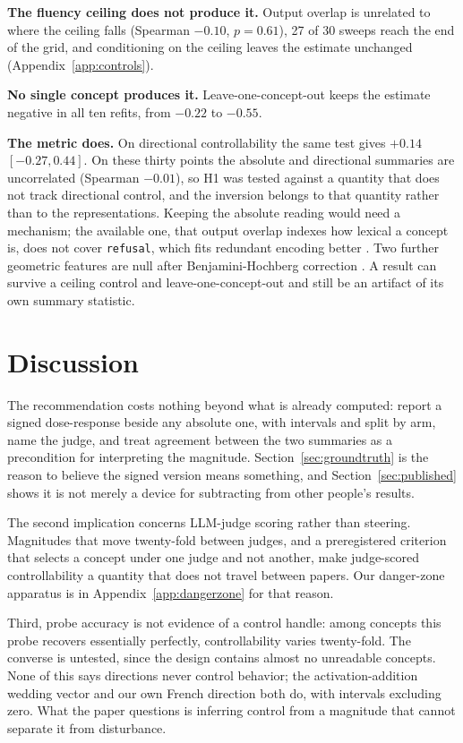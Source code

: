 \documentclass{article}
\begin{document}
\textbf{The fluency ceiling does not produce it.} Output overlap is unrelated to
where the ceiling falls (Spearman $-0.10$, $p=0.61$), 27 of 30 sweeps reach the
end of the grid, and conditioning on the ceiling leaves the estimate unchanged
(Appendix~\ref{app:controls}).

\textbf{No single concept produces it.} Leave-one-concept-out keeps the estimate
negative in all ten refits, from $-0.22$ to $-0.55$.

\textbf{The metric does.} On directional controllability the same test gives
$+0.14$ $[-0.27, 0.44]$. On these thirty points the absolute and directional
summaries are uncorrelated (Spearman $-0.01$), so H1 was tested against a
quantity that does not track directional control, and the inversion belongs to
that quantity rather than to the representations. Keeping the absolute reading
would need a mechanism; the available one, that output overlap indexes how
lexical a concept is, does not cover \texttt{refusal}, which fits redundant
encoding better \citep{joad2026refusal, elhage2022superposition}. Two further
geometric features are null after Benjamini-Hochberg correction
\citep{benjamini1995fdr}. A result can survive a ceiling control and
leave-one-concept-out and still be an artifact of its own summary statistic.

\section{Discussion}

The recommendation costs nothing beyond what is already computed: report a
signed dose-response beside any absolute one, with intervals and split by arm,
name the judge, and treat agreement between the two summaries as a precondition
for interpreting the magnitude. Section~\ref{sec:groundtruth} is the reason to
believe the signed version means something, and Section~\ref{sec:published}
shows it is not merely a device for subtracting from other people's results.

The second implication concerns LLM-judge scoring rather than steering.
Magnitudes that move twenty-fold between judges, and a preregistered criterion
that selects a concept under one judge and not another, make judge-scored
controllability a quantity that does not travel between papers. Our danger-zone
apparatus is in Appendix~\ref{app:dangerzone} for that reason.

Third, probe accuracy is not evidence of a control handle: among concepts this
probe recovers essentially perfectly, controllability varies twenty-fold. The
converse is untested, since the design contains almost no unreadable concepts.
None of this says directions never control behavior; the activation-addition
wedding vector and our own French direction both do, with intervals excluding
zero. What the paper questions is inferring control from a magnitude that cannot
separate it from disturbance.
\end{document}
